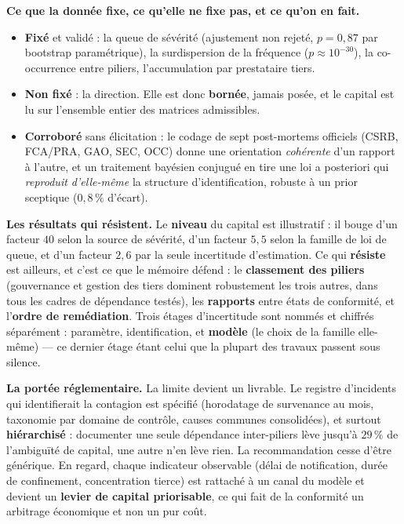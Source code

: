 \documentclass[10pt,a4paper]{article}
\begin{document}
\begin{cle}
\textbf{Ce que la donnée fixe, ce qu'elle ne fixe pas, et ce qu'on en fait.}
\begin{itemize}[leftmargin=12pt,itemsep=1pt,topsep=2pt]
\item \textbf{Fixé} et validé : la queue de sévérité (ajustement non rejeté, $p=0{,}87$ par
      bootstrap paramétrique), la surdispersion de la fréquence ($p\approx10^{-30}$), la
      co-occurrence entre piliers, l'accumulation par prestataire tiers.
\item \textbf{Non fixé} : la direction. Elle est donc \textbf{bornée}, jamais posée, et le
      capital est lu sur l'ensemble entier des matrices admissibles.
\item \textbf{Corroboré} sans élicitation : le codage de sept post-mortems officiels (CSRB,
      FCA/PRA, GAO, SEC, OCC) donne une orientation \emph{cohérente} d'un rapport à l'autre, et
      un traitement bayésien conjugué en tire une loi a posteriori qui \emph{reproduit d'elle-même}
      la structure d'identification, robuste à un prior sceptique ($0{,}8\,\%$ d'écart).
\end{itemize}
\end{cle}

\textbf{Les résultats qui résistent.} Le \textbf{niveau} du capital est illustratif : il bouge
d'un facteur $40$ selon la source de sévérité, d'un facteur $5{,}5$ selon la famille de loi de
queue, et d'un facteur $2{,}6$ par la seule incertitude d'estimation. Ce qui \textbf{résiste} est
ailleurs, et c'est ce que le mémoire défend : le \textbf{classement des piliers} (gouvernance et
gestion des tiers dominent robustement les trois autres, dans tous les cadres de dépendance
testés), les \textbf{rapports} entre états de conformité, et l'\textbf{ordre de remédiation}.
Trois étages d'incertitude sont nommés et chiffrés séparément : paramètre, identification,
et \textbf{modèle} (le choix de la famille elle-même) --- ce dernier étage étant celui que la
plupart des travaux passent sous silence.

\textbf{La portée réglementaire.} La limite devient un livrable. Le registre d'incidents qui
identifierait la contagion est spécifié (horodatage de survenance au mois, taxonomie par domaine
de contrôle, causes communes consolidées), et surtout \textbf{hiérarchisé} : documenter une seule
dépendance inter-piliers lève jusqu'à $29\,\%$ de l'ambiguïté de capital, une autre n'en lève
rien. La recommandation cesse d'être générique. En regard, chaque indicateur observable
(délai de notification, durée de confinement, concentration tierce) est rattaché à un canal du
modèle et devient un \textbf{levier de capital priorisable}, ce qui fait de la conformité un
arbitrage économique et non un pur coût.
\end{document}
